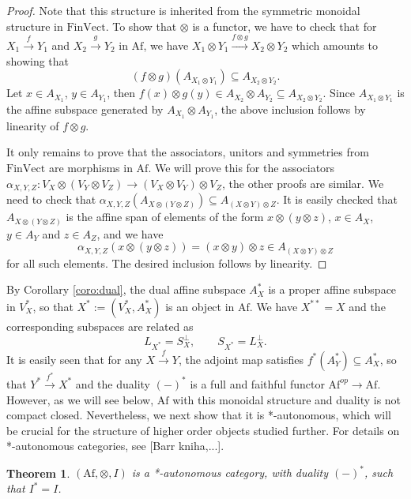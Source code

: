 \documentclass[12pt]{article}
\newtheorem{theorem}{Theorem}
\theoremstyle{definition}
\theoremstyle{remark}
\def \Af{\mathrm{Af}}
\def \FV{\mathrm{FinVect}}
\begin{document}
\begin{proof} Note that this structure is inherited from the symmetric monoidal structure
in $\FV$. To show that $\otimes$ is a functor, we have to check that for $X_1\xrightarrow{f} Y_1$ and $X_2\xrightarrow{g} Y_2$ in
$\Af$, we have $X_1\otimes Y_1\xrightarrow{f\otimes g} X_2\otimes Y_2$ which amounts to
showing that 
\[
(f\otimes g)(A_{X_1\otimes Y_1})\subseteq A_{X_2\otimes Y_2}.
\]
Let $x\in A_{X_1}$, $y\in A_{Y_1}$, then $f(x)\otimes g(y)\in A_{X_2}\otimes
A_{Y_2}\subseteq A_{X_2\otimes Y_2}$. Since  $A_{X_1\otimes Y_1}$ is the affine subspace
generated by $A_{X_1}\otimes A_{Y_1}$, the above inclusion follows by linearity of $f\otimes
g$. 

It only remains to prove that the associators, unitors and symmetries from
$\FV$ are morphisms in $\Af$. We will prove this for the associators $\alpha_{X,Y,Z}:V_X\otimes (V_Y\otimes V_Z)\to
(V_X\otimes V_Y)\otimes V_Z$, the other proofs are similar. We need to check that
$\alpha_{X,Y,Z}(A_{X\otimes(Y\otimes Z)})\subseteq A_{(X\otimes Y)\otimes Z}$. It is easily
checked that $A_{X\otimes(Y\otimes Z)}$ is the affine span of elements of the form
$x\otimes (y\otimes z)$, $x\in A_X$, $y\in A_Y$ and $z\in A_Z$, and we have
\[
\alpha_{X,Y,Z}(x\otimes (y\otimes z))=(x\otimes y)\otimes z\in A_{(X\otimes Y)\otimes Z}
\]
for all such elements. The desired inclusion follows by linearity.

\end{proof}


By Corollary \ref{coro:dual},  the dual affine subspace $A^*_X$ is a proper affine subspace in $V_X^*$, so that
$X^*:=(V_X^*,A^*_X)$ is an object in $\Af$. We have $X^{**}=X$ and the corresponding subspaces
are related as
\begin{equation}\label{eq:duality}
L_{X^*}=S_X^\perp,\qquad S_{X^*}=L_X^\perp.
\end{equation}
It is easily seen that for any  $X\xrightarrow{f} Y$, the adjoint map satisfies $f^*(
A_Y^*)\subseteq A^*_X$, so that $Y^*\xrightarrow{f^*} X^*$ and the duality $(-)^*$ is a
full and faithful functor 
$\Af^{op}\to \Af$. However, as we will see below, $\Af$ with this monoidal structure and
duality is not compact closed. Nevertheless, we next show that it is *-autonomous, which
will be crucial for the structure of higher order objects studied further. For details on *-autonomous
categories, see [Barr kniha,...].

\begin{theorem} $(\Af,\otimes,I)$ is a *-autonomous category, with duality $(-)^*$, such
that $I^*=I$.

\end{theorem}
\end{document}
